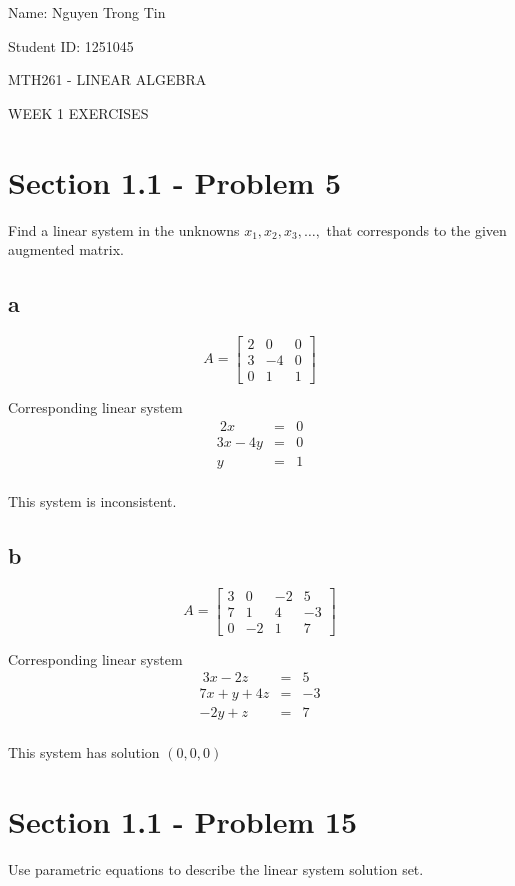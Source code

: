 \documentclass[a4paper,12pt]{report}
\begin{document}
Name: Nguyen Trong Tin

Student ID: 1251045 

\centerline{MTH261 - LINEAR ALGEBRA}
\centerline{WEEK 1 EXERCISES}

\section*{Section 1.1 - Problem 5}
Find a linear system in the unknowns \(x_1,x_2,x_3,\ldots,\) that corresponds to the given augmented matrix.
\subsection*{a}
\[
A 
=
\begin{bmatrix}
    2       & 0 & 0 \\
    3       & -4 & 0 \\
    0       & 1 & 1
\end{bmatrix}
\]

Corresponding linear system
\begin{eqnarray*}
\ 2x & = & 0\\
3x - 4y & = & 0\\
y & = & 1\\
\end{eqnarray*}

This system is inconsistent.

\subsection*{b}
\[
A 
=
\begin{bmatrix}
    3       & 0 & -2 & 5 \\
    7       & 1 & 4 & -3\\
    0       & -2 & 1 & 7
\end{bmatrix}
\]

Corresponding linear system
\begin{eqnarray*}
\ 3x -2z & = & 5\\
7x + y + 4z & = & -3\\
-2y + z& = & 7\\
\end{eqnarray*}

This system has solution \((0,0,0)\)

\section*{Section 1.1 - Problem 15}
Use parametric equations to describe the linear system solution set.
\end{document}
